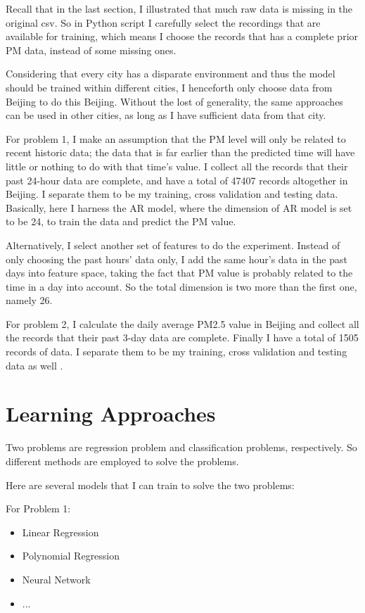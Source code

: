 \documentclass{sig-alternate}
\begin{document}
Recall that in the last section, I illustrated that much raw data is missing in the original csv. So in Python script I carefully select the recordings that are available for training, which means I choose the records that has a complete prior PM data, instead of some missing ones.

Considering that every city has a disparate environment and thus the model should be trained within different cities, I henceforth only choose data from Beijing to do this Beijing. Without the lost of generality, the same approaches can be used in other cities, as long as I have sufficient data from that city.

For problem 1, I make an assumption that the PM level will only be related to recent historic data; the data that is far earlier than the predicted time will have little or nothing to do with that time's value. I collect all the records that their past 24-hour data are complete, and have a total of 47407 records altogether in Beijing. I separate them to be my training, cross validation and testing data. Basically, here I harness the AR model, where the dimension of AR model is set to be 24, to train the data and predict the PM value.

 Alternatively, I select another set of features to do the experiment. Instead of only choosing the past hours' data only, I add the same hour's data in the past days into feature space, taking the fact that PM value is probably related to the time in a day into account. So the total dimension is two more than the first one, namely 26.

For problem 2, I calculate the daily average PM2.5 value in Beijing and collect all the records that their past 3-day data are complete. Finally I have a total of 1505 records of data. I separate them to be my training, cross validation and testing data as well .






\section{Learning Approaches}
Two problems are regression problem and classification problems, respectively. So different methods are employed to solve the problems.

Here are several models that I can train to solve the two problems:


For Problem 1:
\begin{itemize}
	\item Linear Regression
    \item Polynomial Regression
	\item Neural Network
    \item ...
\end{itemize}
\end{document}
